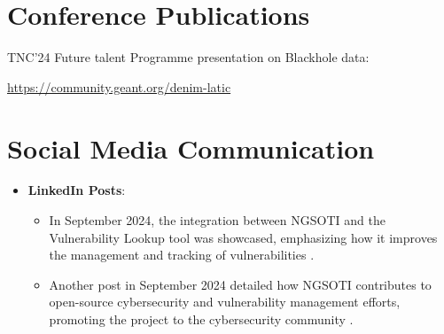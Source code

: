 \section{Conference Publications}

TNC'24 Future talent Programme presentation on Blackhole data:

  \url{https://community.geant.org/denim-latic}



\section{Social Media Communication}
\begin{itemize}
    \item \textbf{LinkedIn Posts}:
    \begin{itemize}
        \item In September 2024, the integration between NGSOTI and the Vulnerability Lookup tool was showcased, emphasizing how it improves the management and tracking of vulnerabilities \cite{kunai_integration}.
        \item Another post in September 2024 detailed how NGSOTI contributes to open-source cybersecurity and vulnerability management efforts, promoting the project to the cybersecurity community \cite{ngsoti_opensource}.
    \end{itemize}
\end{itemize}


